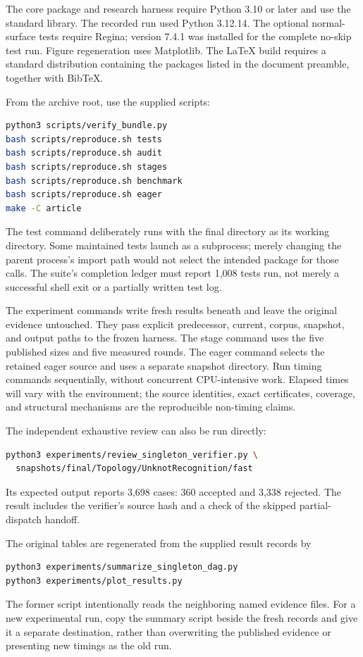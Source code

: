 The core package and research harness require Python 3.10 or later and use
the standard library. The recorded run used Python 3.12.14. The optional
normal-surface tests require Regina; version 7.4.1 was installed for the
complete no-skip test run. Figure regeneration uses Matplotlib. The
\LaTeX{} build requires a standard distribution containing the packages
listed in the document preamble, together with BibTeX.

From the archive root, use the supplied scripts:
\begin{lstlisting}[language=bash]
python3 scripts/verify_bundle.py
bash scripts/reproduce.sh tests
bash scripts/reproduce.sh audit
bash scripts/reproduce.sh stages
bash scripts/reproduce.sh benchmark
bash scripts/reproduce.sh eager
make -C article
\end{lstlisting}
The test command deliberately runs with the final  directory
as its working directory. Some maintained tests launch
 as a subprocess; merely changing the parent
process's import path would not select the intended package for those calls.
The suite's completion ledger must report 1,008 tests run, not merely a
successful shell exit or a partially written test log.

The experiment commands write fresh results beneath 
and leave the original evidence untouched. They pass explicit predecessor,
current, corpus, snapshot, and output paths to the frozen harness. The
stage command uses the five published sizes and five measured rounds.
The eager command selects the retained eager source and uses a separate
snapshot directory. Run timing commands sequentially, without concurrent
CPU-intensive work. Elapsed times will vary with the environment; the
source identities, exact certificates, coverage, and structural mechanisms
are the reproducible non-timing claims.

The independent exhaustive review can also be run directly:
\begin{lstlisting}[language=bash]
python3 experiments/review_singleton_verifier.py \
  snapshots/final/Topology/UnknotRecognition/fast
\end{lstlisting}
Its expected output reports 3,698 cases: 360 accepted and 3,338 rejected.
The result includes the verifier's source hash and a check of the skipped
partial-dispatch handoff.

The original tables are regenerated from the supplied result records by
\begin{lstlisting}[language=bash]
python3 experiments/summarize_singleton_dag.py
python3 experiments/plot_results.py
\end{lstlisting}
The former script intentionally reads the neighboring named evidence files.
For a new experimental run, copy the summary script beside the fresh records
and give it a separate \code{--article-generated} destination, rather than
overwriting the published evidence or presenting new timings as the old run.

